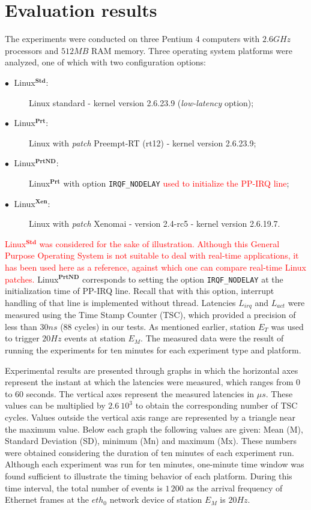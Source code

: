 \documentclass{acm_proc_article-sp}
\newcommand{\col}[1]{\textcolor{red}{#1}}
\newcommand{\cod}[1]{\hspace{0.1cm}\texttt{#1}}
\newcommand{\ing}[1]{\emph{#1}}
\newcommand{\preemptt}{{Preempt-RT }}
\begin{document}
\section{Evaluation results}
\label{cap:platEstud}

The experiments were conducted on three Pentium 4 computers with $2.6 GHz$
processors and $512 MB$ RAM memory. Three operating system platforms were analyzed,
one of which with two configuration options:

\begin{description}
\item[$\bullet \;$ Linux$^{\mathbf{Std}}$:] Linux standard - kernel version 2.6.23.9
  (\ing{low-latency} option);
\item[$\bullet \;$ Linux$^{\mathbf{Prt}}$:] Linux with \ing{patch}
  \preemptt (rt12) - kernel version 2.6.23.9;
\item[$\bullet \;$ Linux$^{\mathbf{PrtND}}$:] Linux$^{\mathbf{Prt}}$ with option
  \cod{IRQF\_NODELAY} \col{used to initialize the PP-IRQ line};
\item[$\bullet \;$ Linux$^{\mathbf{Xen}}$:] Linux with \ing{patch} Xenomai - version
  2.4-rc5 - kernel version 2.6.19.7.
\end{description}

\col{Linux$^{\mathbf{Std}}$ was considered for the sake of illustration. Although
  this General Purpose Operating System is not suitable to deal with real-time
  applications, it has been used here as a reference, against which one can compare
  real-time Linux patches. } Linux$^{\mathbf{PrtND}}$ corresponds to setting the
option \cod{IRQF\_NODELAY} at the initialization time of PP-IRQ line. Recall that
with this option, interrupt handling of that line is implemented without thread.
Latencies $L_{irq}$ and $L_{act}$ were measured using the Time Stamp Counter (TSC),
which provided a precision of less than $30 ns$ (88 cycles) in our tests.  As
mentioned earlier, station $E_T$ was used to trigger $20Hz$ events at station $E_M$.
The measured data were the result of running the experiments for ten minutes for
each experiment type and platform.

Experimental results are presented through graphs in which the horizontal axes
represent the instant at which the latencies were measured, which ranges from 0 to
60 seconds.  The vertical axes represent the measured latencies in $\mu s$. These
values can be multiplied by $2.6\:10^3$ to obtain the corresponding number of TSC
cycles.  Values outside the vertical axis range are represented by a triangle near
the maximum value.  Below each graph the following values are given: Mean (M),
Standard Deviation (SD), minimum (Mn) and maximum (Mx). These numbers were obtained
considering the duration of ten minutes of each experiment run. Although each
experiment was run for ten minutes, one-minute time window was found sufficient to
illustrate the timing behavior of each platform.  During this time interval, the
total number of events is $1\,200$ as the arrival frequency of Ethernet frames at the
$eth_0$ network device of station $E_M$ is $20 Hz$.
\end{document}
